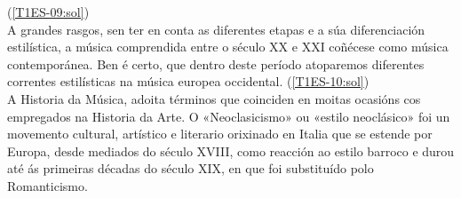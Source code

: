 %
%
    {%
    (\ref{T1ES-09:sol}) {\color{orange}{\hrulefill}}
    \\ \small{%
    A grandes rasgos, sen ter en conta as diferentes etapas e a súa diferenciación estilística, a música comprendida entre o século XX e XXI coñécese como música contemporánea. Ben é certo, que dentro deste período atoparemos diferentes correntes estilísticas na música europea occidental.
    {\color{orange}{\hrulefill}}
    }
    }
%
%
    {%
    (\ref{T1ES-10:sol}) {\color{orange}{\hrulefill}}
    \\ \small{%
    A Historia da Música, adoita términos que coinciden en moitas ocasións cos empregados na Historia da Arte. O «Neoclasicismo» ou «estilo neoclásico» foi un movemento cultural, artístico e literario orixinado en Italia que se estende por Europa, desde mediados do século XVIII, como reacción ao estilo barroco e durou até ás primeiras décadas do século XIX, en que foi substituído polo Romanticismo.
    {\color{orange}{\hrulefill}}
    }
    }
%
